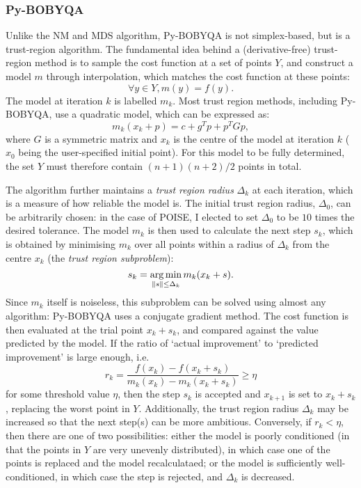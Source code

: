 \subsubsection{Py-BOBYQA}

Unlike the NM and MDS algorithm, Py-BOBYQA is not simplex-based, but is a trust-region algorithm.\autocite{Powell2009Proc,Cartis2019ACMTMS}
The fundamental idea behind a (derivative-free) trust-region method is to sample the cost function at a set of points $Y$, and construct a model $m$ through interpolation, which matches the cost function at these points:
\begin{equation}
    \label{eq:trust_region_model}
    \forall y \in Y, m(y) = f(y).
\end{equation}
The model at iteration $k$ is labelled $m_k$.
Most trust region methods, including Py-BOBYQA, use a quadratic model, which can be expressed as:
\begin{equation}
    \label{eq:trust_region_quadratic_model}
    m_k(x_k + p) = c + g^Tp + p^TGp,
\end{equation}
where $G$ is a symmetric matrix and $x_k$ is the centre of the model at iteration $k$ ($x_0$ being the user-specified initial point).
For this model to be fully determined, the set $Y$ must therefore contain $(n+1)(n+2)/2$ points in total.

The algorithm further maintains a \textit{trust region radius} $\Delta_k$ at each iteration, which is a measure of how reliable the model is.
The initial trust region radius, $\Delta_0$, can be arbitrarily chosen: in the case of POISE, I elected to set $\Delta_0$ to be $10$ times the desired tolerance.
The model $m_k$ is then used to calculate the next step $s_k$, which is obtained by minimising $m_k$ over all points within a radius of $\Delta_k$ from the centre $x_k$ (the \textit{trust region subproblem}):
\begin{equation}
    \label{eq:trust_region_subproblem}
    s_k = \operatorname*{arg\,min}_{\lVert s \rVert \leq \Delta_k} m_k(x_k + s).
\end{equation}
Since $m_k$ itself is noiseless, this subproblem can be solved using almost any algorithm: Py-BOBYQA uses a conjugate gradient method.
The cost function is then evaluated at the trial point $x_k + s_k$, and compared against the value predicted by the model.
If the ratio of `actual improvement' to `predicted improvement' is large enough, i.e.
\begin{equation}
    \label{eq:trust_region_threshold}
    r_k = \frac{f(x_k) - f(x_k + s_k)}{m_k(x_k) - m_k(x_k + s_k)} \geq \eta
\end{equation}
for some threshold value $\eta$, then the step $s_k$ is accepted and $x_{k+1}$ is set to $x_k + s_k$, replacing the worst point in $Y$.
Additionally, the trust region radius $\Delta_k$ may be increased so that the next step(s) can be more ambitious.
Conversely, if $r_k < \eta$, then there are one of two possibilities: either the model is poorly conditioned (in that the points in $Y$ are very unevenly distributed), in which case one of the points is replaced and the model recalculataed; or the model is sufficiently well-conditioned, in which case the step is rejected, and $\Delta_k$ is decreased.

